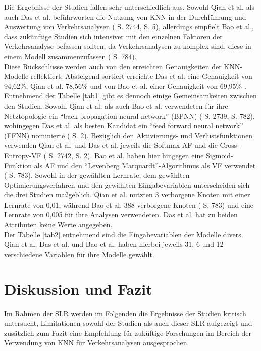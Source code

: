 \documentclass{scrartcl}
\begin{document}
Die Ergebnisse der Studien fallen sehr unterschiedlich aus. Sowohl Qian et al.
als auch Das et al. beführworten die Nutzung von KNN in der Durchführung
und Auswertung von Verkehrsanalysen (\cite{qian} S. 2744, \cite{das} S. 5),
allerdings empfielt Bao et al., dass zukünftige Studien sich intensiver mit
den einzelnen Faktoren der Verkehrsanalyse befassen sollten, da Verkehrsanalysen
zu komplex sind, diese in einem Modell zusammenzufassen (\cite{bao} S. 784).
\medskip \\
Diese Rückschlüsse werden auch von den erreichten Genauigkeiten der KNN-Modelle
reflektiert: Absteigend sortiert erreichte Das et al. eine Genauigkeit von 94,62\%, Qian et al. 78,56\%
und von Bao et al. einer Genauigkeit von 69,95\% \cite{das, qian, bao}.
\medskip \\
Entnehmend der Tabelle \ref{tab1} gibt es dennoch einige Gemeinsamkeiten
zwischen den Studien. Sowohl Qian et al. als auch Bao et al. verwendeten für
ihre Netztopologie ein \enquote{back propagation neural network} (BPNN)
(\cite{qian} S. 2739, \cite{bao} S. 782), wohingegen Das et al. als besten Kandidat
ein \enquote{feed forward neural network} (FFNN) nominierte (\cite{das} S. 2).
Bezüglich den Aktivierungs- und Verlustsfunktionen verwenden Qian et al.
und Das et al. jeweils die Softmax-AF und die Cross-Entropy-VF
(\cite{qian} S. 2742, \cite{das} S. 2).
Bao et al. haben hier hingegen eine Sigmoid-Funktion als AF und den
\enquote{Levenberg Marquardt}-Algorithmus als VF verwendet (\cite{bao} S. 783).
Sowohl in der gewählten Lernrate, dem gewählten Optimierungsverfahren und den
gewählten Eingabevariablen unterscheiden sich die drei Studien maßgeblich.
Qian et al. nutzten 3 verborgene Knoten mit einer Lernrate von 0,01, während
Bao et al. 388 verborgene Knoten (\cite{bao} S. 783) und eine Lernrate von 0,005 
für ihre Analysen verwendeten. 
Das et al. hat zu beiden Attributen keine Werte angegeben.
\medskip \\
Der Tabelle \ref{tab2} entnehmend sind die Eingabevariablen der Modelle divers.
Qian et al, Das et al. und Bao et al. haben hierbei jeweils 31, 6 und 12 
verschiedene Variablen für ihre Modelle gewählt.

\section{Diskussion und Fazit}

Im Rahmen der SLR werden im Folgenden die Ergebnisse der Studien kritisch untersucht,
Limitationen sowohl der Studien als auch dieser SLR aufgezeigt und zusätzlich
zum Fazit eine Empfehlung für zuküftige Forschungen im Bereich der Verwendung
von KNN für Verkehrsanalysen ausgesprochen.
\end{document}
